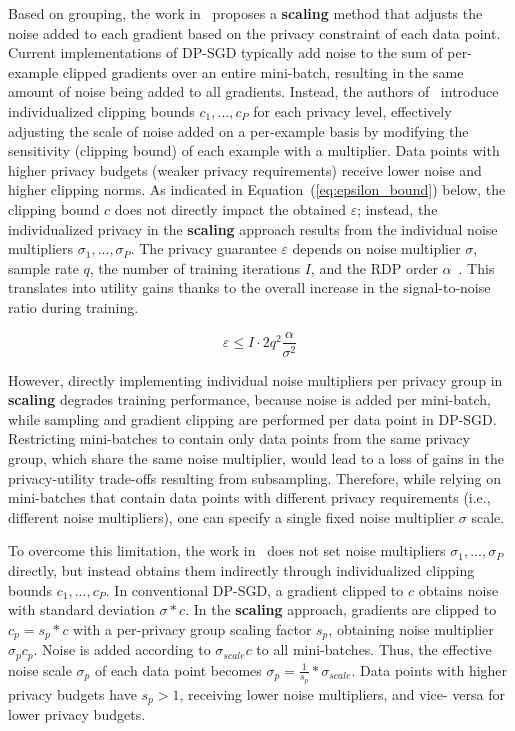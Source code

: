 Based on grouping, the work in~\cite{haveit} proposes a {\bf scaling} method that adjusts the noise added to each gradient based on the privacy constraint of each data point. Current implementations of DP-SGD typically add noise to the sum of per-example clipped gradients over an entire mini-batch, resulting in the same amount of noise being added to all gradients. Instead, the authors of~\cite{haveit} introduce individualized clipping bounds ${c_1, ..., c_P}$ for each privacy level, effectively adjusting the scale of noise added on a per-example basis by modifying the sensitivity (clipping bound) of each example with a multiplier. Data points with higher privacy budgets (weaker privacy requirements) receive lower noise and higher clipping norms. As indicated in Equation~(\ref{eq:epsilon_bound}) below, the clipping bound $c$ does not directly impact the obtained $\varepsilon$; instead, the individualized privacy in the {\bf scaling} approach results from the individual noise multipliers ${\sigma_1, ..., \sigma_P}$. The privacy guarantee $\varepsilon$ depends on noise multiplier $\sigma$, sample rate $q$, the number of training iterations $I$, and the RDP order $\alpha$~\cite{haveit}. This translates into utility gains thanks to the overall increase in the signal-to-noise ratio during training.

\begin{equation}\label{eq:epsilon_bound}
\varepsilon \leq I \cdot 2q^2 \frac{{}\alpha}{\sigma^2}
\end{equation}

However, directly implementing individual noise multipliers per privacy group in {\bf scaling}  degrades training performance, because noise is added per mini-batch, while sampling and gradient clipping are performed per data point in DP-SGD. Restricting mini-batches to contain only data points from the same privacy group, which share the same noise multiplier, would lead to a loss of gains in the privacy-utility trade-offs resulting from subsampling. Therefore, while relying on mini-batches that contain data points with different privacy requirements (i.e., different noise multipliers), one can  specify a single fixed noise multiplier $\sigma$ scale.

To overcome this limitation, the work in~\cite{haveit} does not set noise multipliers ${\sigma_1, ..., \sigma_P}$ directly, but instead obtains them indirectly through individualized clipping bounds ${c_1, ..., c_P}$. In conventional DP-SGD, a gradient clipped to $c$ obtains noise with standard deviation $\sigma*c$. In the {\bf scaling} approach, gradients are clipped to $c_p = s_p*c$ with a per-privacy group scaling factor $s_p$, obtaining noise multiplier $\sigma_p c_p$. Noise is added according to $\sigma_{scale}c$ to all mini-batches. Thus, the effective noise scale $\sigma_p$ of each data point becomes $\sigma_p = \frac{1}{s_p} * \sigma_{scale}$. Data points with higher privacy budgets have $s_p > 1$, receiving lower noise multipliers, and vice- versa for lower privacy budgets.

